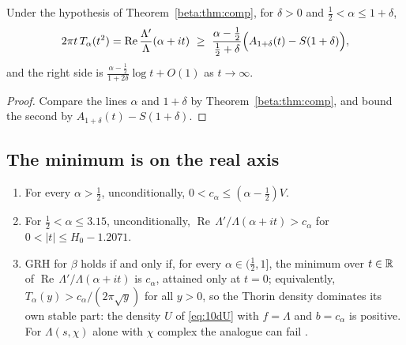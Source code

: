 \begin{corollary}\label{beta:cor:lower}
Under the hypothesis of Theorem~\ref{beta:thm:comp}, for $\delta>0$ and $\tfrac12<\alpha\le1+\delta$,
\[
2\pi t\,T_\alpha(t^2)=\operatorname{Re}\frac{\Lambda'}{\Lambda}(\alpha+it)\ \ge\ \frac{\alpha-\frac12}{\frac12+\delta}\Bigl(A_{1+\delta}(t)-S(1+\delta)\Bigr),
\]
and the right side is $\tfrac{\alpha-\frac12}{1+2\delta}\log t+O(1)$ as $t\to\infty$.
\end{corollary}

\begin{proof}
Compare the lines $\alpha$ and $1+\delta$ by Theorem~\ref{beta:thm:comp}, and bound the second by $A_{1+\delta}(t)-S(1+\delta)$.
\end{proof}

\subsection{The minimum is on the real axis}

\begin{theorem}\label{beta:thm:minall}
\begin{enumerate}
\item[(i)] For every $\alpha>\tfrac12$, unconditionally, $0<c_\alpha\le(\alpha-\tfrac12)V$.
\item[(ii)] For $\tfrac12<\alpha\le3.15$, unconditionally, $\operatorname{Re}\,\Lambda'/\Lambda(\alpha+it)>c_\alpha$ for $0<|t|\le H_0-1.2071$.
\item[(iii)] GRH for $\beta$ holds if and only if, for every $\alpha\in(\tfrac12,1]$, the minimum over $t\in\mathbb{R}$ of $\operatorname{Re}\,\Lambda'/\Lambda(\alpha+it)$ is $c_\alpha$, attained only at $t=0$; equivalently, $T_\alpha(y)>c_\alpha/(2\pi\sqrt y)$ for all $y>0$, so the Thorin density dominates its own stable part: the density $U$ of \eqref{eq:10dU} with $f=\Lambda$ and $b=c_\alpha$ is positive. For $\Lambda(s,\chi)$ alone with $\chi$ complex the analogue can fail \cite[Remark~31]{polson2018vdp}.
\end{enumerate}
\end{theorem}

